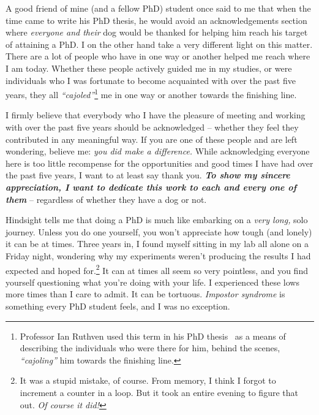 

\begin{preamble}
\setcounter{footnote}{0}
{}

A good friend of mine (and a fellow PhD) student once said to me that when the time came to write his PhD thesis, he would avoid an acknowledgements section where \emph{everyone and their} dog would be thanked for helping him reach his target of attaining a PhD. I on the other hand take a very different light on this matter. There are a lot of people who have in one way or another helped me reach where I am today. Whether these people actively guided me in my studies, or were individuals who I was fortunate to become acquainted with over the past five years, they all \emph{``cajoled''}\footnote{Professor Ian Ruthven used this term in his PhD thesis~\citep{ruthven2001phd} as a means of describing the individuals who were there for him, behind the scenes, \emph{``cajoling''} him towards the finishing line.} me in one way or another towards the finishing line.

I firmly believe that everybody who I have the pleasure of meeting and working with over the past five years should be acknowledged -- whether they feel they contributed in any meaningful way. If you are one of these people and are left wondering, believe me: \emph{you did make a difference.} While acknowledging everyone here is too little recompense for the opportunities and good times I have had over the past five years, I want to at least say thank you. \textbf{\emph{To show my sincere appreciation, I want to dedicate this work to each and every one of them}} -- regardless of whether they have a dog or not.

Hindsight tells me that doing a PhD is much like embarking on a \emph{very long,} solo journey. Unless you do one yourself, you won't appreciate how tough (and lonely) it can be at times. Three years in, I found myself sitting in my lab all alone on a Friday night, wondering why my experiments weren't producing the results I had expected and hoped for.\footnote{It was a stupid mistake, of course. From memory, I think I forgot to increment a counter in a loop. But it took an entire evening to figure that out. \emph{Of course it did!}} It can at times all seem so very pointless, and you find yourself questioning what you're doing with your life. I experienced these lows more times than I care to admit. It can be tortuous. \emph{Impostor syndrome} is something every PhD student feels, and I was no exception.


\end{preamble}
